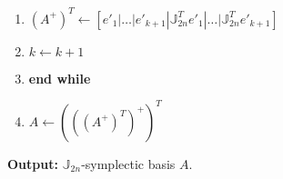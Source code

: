 \begin{algorithm}
\begin{enumerate}
\item \hspace{0.5cm} $(A^+)^T \leftarrow [e'_1|\dots |e'_{k+1} | \mathbb J^T_{2n}e'_1|\dots|\mathbb J^T_{2n}e'_{k+1}]$
\item \hspace{0.5cm} $k \leftarrow k+1$
\item \textbf{end while}
\item $A \leftarrow \left( \left( \left( A^+\right) ^T \right ) ^+ \right)^T$
\end{enumerate}
\vspace{0.5cm}
{\bf Output:} $\mathbb J_{2n}$-symplectic basis $A$.
\end{algorithm}
